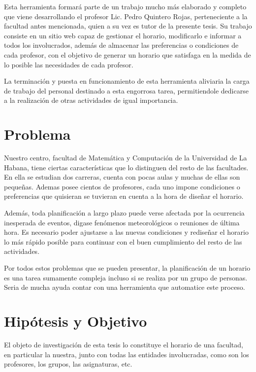 \begin{introduction}
Esta herramienta formará parte de un trabajo mucho más elaborado y completo que viene desarrollando
el profesor Lic. Pedro Quintero Rojas, perteneciente a la facultad antes mencionada, quien a su vez
es tutor de la presente tesis. Su trabajo consiste en un sitio web capaz de gestionar el horario,
modificarlo e informar a todos los involucrados, además de almacenar las preferencias o condiciones
de cada profesor, con el objetivo de generar un horario que satisfaga en la medida de lo posible
las necesidades de cada profesor.

La terminación y puesta en funcionamiento de esta herramienta aliviaria la carga de trabajo del
personal destinado a esta engorrosa tarea, permitiendole dedicarse a la realización de otras
actividades de igual importancia.

\section*{Problema}

Nuestro centro, facultad de Matemática y Computación de la Universidad de La Habana, tiene ciertas
características que lo distinguen del resto de las facultades. En ella se estudian dos carreras,
cuenta con pocas aulas y muchas de ellas son pequeñas. Ademas posee cientos de profesores, cada uno
impone condiciones o preferencias que quisieran se tuvieran en cuenta a la hora de diseñar el horario.

Además, toda planificación a largo plazo puede verse afectada por la ocurrencia inesperada de eventos,
digase fenómenos meteorológicos o reuniones de última hora. Es necesario poder ajustarse a las nuevas
condiciones y rediseñar el horario lo más rápido posible para continuar con el buen cumplimiento del
resto de las actividades.

Por todos estos problemas que se pueden presentar, la planificación de un horario es una tarea sumamente 
compleja incluso si se realiza por un grupo de personas. Seria de mucha ayuda contar con una herramienta
que automatice este proceso.

\section*{Hipótesis y Objetivo}

El objeto de investigación de esta tesis lo constituye el horario de una facultad, en particular la nuestra,
junto con todas las entidades involucradas, como son los profesores, los grupos, las asignaturas, etc.


\end{introduction}
